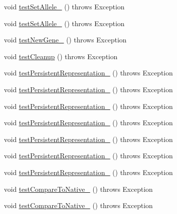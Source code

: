 \begin{DoxyCompactItemize}
\item 
void \hyperlink{classorg_1_1jgap_1_1impl_1_1_integer_gene_test_ae034e141ed7ea58f40fb5cc12550111d}{test\-Set\-Allele\-\_} ()  throws Exception 
\item 
void \hyperlink{classorg_1_1jgap_1_1impl_1_1_integer_gene_test_aa5b779a2469d3255e6f1e7a2a0e77eb4}{test\-Set\-Allele\-\_} ()  throws Exception 
\item 
void \hyperlink{classorg_1_1jgap_1_1impl_1_1_integer_gene_test_ac4a66a79af1de04b9e5681e2c81c1806}{test\-New\-Gene\-\_} ()  throws Exception 
\item 
void \hyperlink{classorg_1_1jgap_1_1impl_1_1_integer_gene_test_a6d8451339f7b2edb73b63e90204968bb}{test\-Cleanup} ()  throws Exception 
\item 
void \hyperlink{classorg_1_1jgap_1_1impl_1_1_integer_gene_test_a79d3b412d48f51524a9971532393e9f3}{test\-Persistent\-Representation\-\_} ()  throws Exception 
\item 
void \hyperlink{classorg_1_1jgap_1_1impl_1_1_integer_gene_test_afe86114316b7ba9ed44342fa67f9c978}{test\-Persistent\-Representation\-\_} ()  throws Exception 
\item 
void \hyperlink{classorg_1_1jgap_1_1impl_1_1_integer_gene_test_aa9a1b9e80aa3d7137a14bcae1ce5442e}{test\-Persistent\-Representation\-\_} ()  throws Exception 
\item 
void \hyperlink{classorg_1_1jgap_1_1impl_1_1_integer_gene_test_a70f12c3c52313d5353c8fc0e58905126}{test\-Persistent\-Representation\-\_} ()  throws Exception 
\item 
void \hyperlink{classorg_1_1jgap_1_1impl_1_1_integer_gene_test_a973abf0b1abc9822f37e755d4661ca0a}{test\-Persistent\-Representation\-\_} ()  throws Exception 
\item 
void \hyperlink{classorg_1_1jgap_1_1impl_1_1_integer_gene_test_afe2b0dc1d4c89335afe0c8bdd1668578}{test\-Persistent\-Representation\-\_} ()  throws Exception 
\item 
void \hyperlink{classorg_1_1jgap_1_1impl_1_1_integer_gene_test_a6db638a4ed7cb78bda76ad0b9cabbd40}{test\-Persistent\-Representation\-\_} ()  throws Exception 
\item 
void \hyperlink{classorg_1_1jgap_1_1impl_1_1_integer_gene_test_ad346e993537f0d1a1ed124f63c7c9482}{test\-Compare\-To\-Native\-\_} ()  throws Exception 
\item 
void \hyperlink{classorg_1_1jgap_1_1impl_1_1_integer_gene_test_aaca30ad0957426960df82c3d0181720b}{test\-Compare\-To\-Native\-\_} ()  throws Exception 

\end{DoxyCompactItemize}
